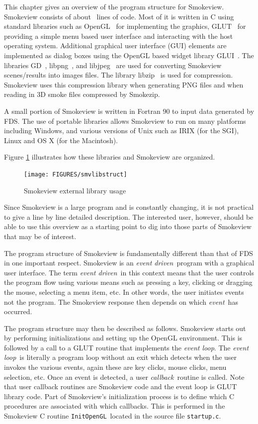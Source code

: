 \documentclass[11pt,twoside]{book}
\begin{document}
This chapter gives an overview of the program structure for
Smokeview. Smokeview consists of about \smvlines\ lines of code.
Most of it is written in C using standard libraries such as
OpenGL~\cite{OpenGLRed} for implementing the graphics,
GLUT~\cite{OpenGLGlut} for providing a simple menu based user
interface and interacting with the host operating system.
Additional graphical user interface (GUI) elements are implemented
as dialog boxes using the OpenGL based widget library
GLUI~\cite{GLUILIB}. The libraries GD~\cite{GDLIB},
libpng~\cite{PNGLIB}, and libjpeg~\cite{JPEGLIB} are used for
converting Smokeview scenes/results into images files. The library
libzip~\cite{ZLIB} is used for compression. Smokeview uses this
compression library when generating PNG files and when reading in
3D smoke files compressed by Smokezip.

A small portion of Smokeview is written in Fortran 90 to input
data generated by FDS.  The use of portable libraries allows
Smokeview to run on many platforms including Windows, and various
versions of Unix such as IRIX (for the SGI), Linux and OS X (for
the Macintosh).

Figure \ref{smvlibstruct} illustrates how these libraries and
Smokeview are organized.

\begin{figure}
\texttt{[image: FIGURES/smvlibstruct]}
\caption{Smokeview external library usage}
\label{smvlibstruct}
\end{figure}


Since Smokeview is a large program and is constantly changing, it
is not practical to give a line by line detailed description. The
interested user, however, should be able to use this overview as a
starting point to dig into those parts of Smokeview that may be of
interest.

The program structure of Smokeview is fundamentally different than
that of FDS in one important respect.  Smokeview is an {\em event
driven}\ program with a graphical user interface.  The term {\em
event driven}\ in this context means that the user controls the
program flow using various means such as pressing a key, clicking
or dragging the mouse, selecting a menu item, etc.  In other
words, the user initiates events not the program. The Smokeview
response then depends on which {\em event}\ has occurred.

The program structure may then be described as follows. Smokeview
starts out by performing initializations and setting up the
OpenGL environment. This is followed by a call to a GLUT routine
that implements the {\em event loop}. The {\em event loop}\ is
literally a program loop without an exit which detects when the
user invokes the various events, again these are key clicks, mouse
clicks, menu selection, etc. Once an event is detected, a
user {\em callback}\ routine is called.  Note that user callback
routines are Smokeview code and the event loop is GLUT library
code. Part of Smokeview's initialization process is to define
which C procedures are associated with which callbacks.  This is
performed in the Smokeview C routine {\tt InitOpenGL}\ located in
the source file {\tt startup.c}.
\end{document}
